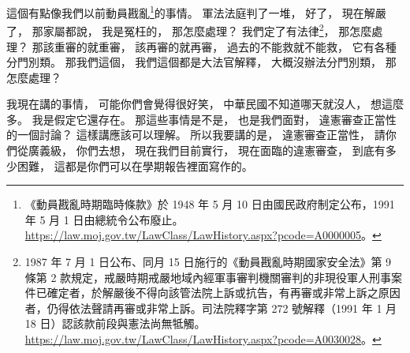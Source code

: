 \hypertarget{w01:cue:1200}{}這個有點像我們以前動員戡亂\footnote{《動員戡亂時期臨時條款》於 1948 年 5 月 10 日由國民政府制定公布，1991 年 5 月 1 日由總統令公布廢止。\url{https://law.moj.gov.tw/LawClass/LawHistory.aspx?pcode=A0000005}。}的事情。
\hypertarget{w01:cue:1201}{}軍法法庭判了一堆，
\hypertarget{w01:cue:1202}{}好了，
\hypertarget{w01:cue:1203}{}現在解嚴了，
\hypertarget{w01:cue:1204}{}那家屬都說，
\hypertarget{w01:cue:1205}{}我是冤枉的，
\hypertarget{w01:cue:1206}{}那怎麼處理？
\hypertarget{w01:cue:1207}{}我們定了有法律\footnote{1987 年 7 月 1 日公布、同月 15 日施行的《動員戡亂時期國家安全法》第 9 條第 2 款規定，戒嚴時期戒嚴地域內經軍事審判機關審判的非現役軍人刑事案件已確定者，於解嚴後不得向該管法院上訴或抗告，有再審或非常上訴之原因者，仍得依法聲請再審或非常上訴。司法院釋字第 272 號解釋（1991 年 1 月 18 日）認該款前段與憲法尚無牴觸。\url{https://law.moj.gov.tw/LawClass/LawHistory.aspx?pcode=A0030028}。}，
\hypertarget{w01:cue:1208}{}那怎麼處理？
\hypertarget{w01:cue:1209}{}那該重審的就重審，
\hypertarget{w01:cue:1210}{}該再審的就再審，
\hypertarget{w01:cue:1211}{}過去的不能救就不能救，
\hypertarget{w01:cue:1212}{}它有各種分門別類。
\hypertarget{w01:cue:1213}{}那我們這個，
\hypertarget{w01:cue:1214}{}我們這個都是大法官解釋，
\hypertarget{w01:cue:1215}{}大概沒辦法分門別類，
\hypertarget{w01:cue:1216}{}那怎麼處理？

\hypertarget{w01:cue:1217}{}我現在講的事情，
\hypertarget{w01:cue:1218}{}可能你們會覺得很好笑，
\hypertarget{w01:cue:1219}{}中華民國不知道哪天就沒人，
\hypertarget{w01:cue:1220}{}想這麼多。
\hypertarget{w01:cue:1221}{}我是假定它還存在。
\hypertarget{w01:cue:1222}{}那這些事情是不是，
\hypertarget{w01:cue:1223}{}也是我們面對，
\hypertarget{w01:cue:1224}{}違憲審查正當性的一個討論？
\hypertarget{w01:cue:1225}{}這樣講應該可以理解。
\hypertarget{w01:cue:1226}{}所以我要講的是，
\hypertarget{w01:cue:1227}{}違憲審查正當性，
\hypertarget{w01:cue:1228}{}請你們從廣義級，
\hypertarget{w01:cue:1229}{}你們去想，
\hypertarget{w01:cue:1230}{}現在我們目前實行，
\hypertarget{w01:cue:1231}{}現在面臨的違憲審查，
\hypertarget{w01:cue:1232}{}到底有多少困難，
\hypertarget{w01:cue:1233}{}這都是你們可以在學期報告裡面寫作的。

